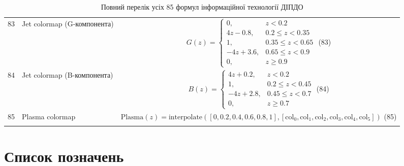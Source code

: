 \documentclass[14pt, a4paper]{extarticle}
\numberwithin{equation}{section}
\begin{document}
\begin{longtable}{|c|p{10cm}|c|}
83 & Jet colormap (G-компонента) & $G(z) = \begin{cases} 0, & z<0.2 \\ 4z-0.8, & 0.2\leq z<0.35 \\ 1, & 0.35\leq z<0.65 \\ -4z+3.6, & 0.65\leq z<0.9 \\ 0, & z\geq0.9 \end{cases}$ \hfill (83) \\
84 & Jet colormap (B-компонента) & $B(z) = \begin{cases} 4z+0.2, & z<0.2 \\ 1, & 0.2\leq z<0.45 \\ -4z+2.8, & 0.45\leq z<0.7 \\ 0, & z\geq0.7 \end{cases}$ \hfill (84) \\
85 & Plasma colormap & $\text{Plasma}(z) = \text{interpolate}([0,0.2,0.4,0.6,0.8,1], [\text{col}_0,\text{col}_1,\text{col}_2,\text{col}_3,\text{col}_4,\text{col}_5])$ \hfill (85) \\
\hline
\caption{Повний перелік усіх 85 формул інформаційної технології ДІПДО}
\label{tab:all_formulas}
\end{longtable}

\newpage

\section*{Список позначень}
\end{document}
